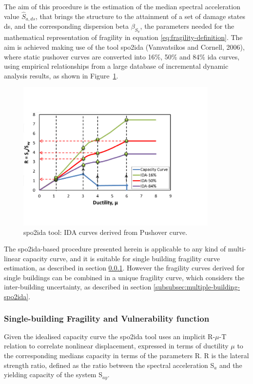 The aim of this procedure is the estimation of the median spectral acceleration value $\hat{S}_{a,ds}$, that brings the structure to the attainment of a set of damage states ds, and the corresponding dispersion beta $\beta_{S_a}$, the parameters needed for the mathematical representation of fragility in equation \ref{eq:fragility-definition}. The aim is achieved making use of the tool spo2ida (Vamvatsikos and Cornell, 2006), where static pushover curves are converted into 16\%, 50\% and 84\% ida curves, using empirical relationships from a large database of incremental dynamic analysis results, as shown in Figure~\ref{fig:spo2ida}.

\begin{figure}[!htbp]
\centering
\includegraphics[width=10cm]{./figures/spo2ida.jpg}
\caption{spo2ida tool: IDA curves derived from Pushover curve.}
\label{fig:spo2ida}
\end{figure}

The spo2ida-based procedure presented herein is applicable to any kind of multi-linear capacity curve, and it is suitable for single building fragility curve estimation, as described in section \ref{subsubsec:single-building-spo2ida}. However the fragility curves derived for single buildings can be combined in a unique fragility curve, which considers the inter-building uncertainty, as described in section \ref{subsubsec:multiple-building-spo2ida}.

\subsubsection{Single-building Fragility and Vulnerability function}
\label{subsubsec:single-building-spo2ida}
Given the idealised capacity curve the spo2ida tool uses an implicit R-$\mu$-T relation to correlate nonlinear displacement, expressed in terms of ductility $\mu$ to the corresponding medians capacity in terms of the parameters R. R is the lateral strength ratio, defined as the ratio between the spectral acceleration S$_a$ and the yielding capacity of the system S$_{ay}$. \\

